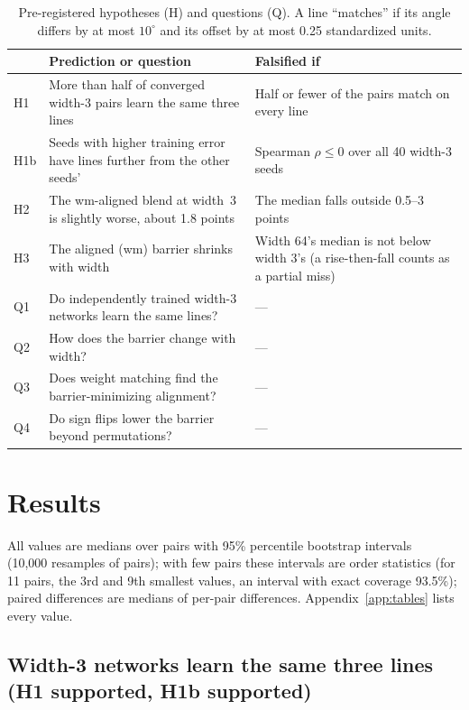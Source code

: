\documentclass[11pt]{article}
\newcommand{\md}[1]{\textsf{#1}}
\begin{document}
\begin{table}[t]
\centering
\small
\caption{Pre-registered hypotheses (H) and questions (Q). A line ``matches'' if its angle differs by at most $10^\circ$ and its offset by at most 0.25 standardized units.}
\label{tab:prereg}
\begin{tabularx}{\linewidth}{@{}lXX@{}}
\toprule
 & Prediction or question & Falsified if \\
\midrule
H1 & More than half of converged width-3 pairs learn the same three lines & Half or fewer of the pairs match on every line \\
H1b & Seeds with higher training error have lines further from the other seeds' & Spearman $\rho \le 0$ over all 40 width-3 seeds \\
H2 & The \md{wm}-aligned blend at width~3 is slightly worse, about 1.8 points & The median falls outside 0.5--3 points \\
H3 & The aligned (\md{wm}) barrier shrinks with width & Width 64's median is not below width 3's (a rise-then-fall counts as a partial miss) \\
\midrule
Q1 & Do independently trained width-3 networks learn the same lines? & --- \\
Q2 & How does the barrier change with width? & --- \\
Q3 & Does weight matching find the barrier-minimizing alignment? & --- \\
Q4 & Do sign flips lower the barrier beyond permutations? & --- \\
\bottomrule
\end{tabularx}
\end{table}

\section{Results}
\label{sec:results}

All values are medians over pairs with 95\% percentile bootstrap intervals~\cite{efron1979bootstrap} (10{,}000 resamples of pairs); with few pairs these intervals are order statistics (for 11 pairs, the 3rd and 9th smallest values, an interval with exact coverage 93.5\%); paired differences are medians of per-pair differences. Appendix~\ref{app:tables} lists every value.

\subsection{Width-3 networks learn the same three lines (H1 supported, H1b supported)}
\end{document}
